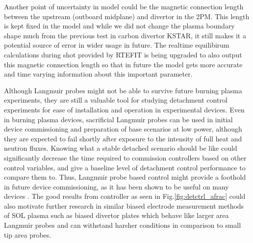 Another point of uncertainty in \Afrac model could be the magnetic connection length between the upstream (outboard midplane) and divertor in the 2PM\cite{Leonard_2018_PPCF}. This length is kept fixed in the model and while we did not change the plasma boundary shape much from the previous test\cite{Eldon_2022_PPCF} in carbon divertor KSTAR, it still makes it a potential source of error in wider usage in future. The realtime equilibirum calculations during shot provided by RTEFIT is being upgraded to also output this magnetic connection length so that in future the model gets more accurate and time varying information about this important parameter.

Although Langmuir probes might not be able to survive future burning plasma experiments, they are still a valuable tool for studying detachment control experiments for ease of installation and operation in experimental devices.
Even in burning plasma devices, sacrificial Langmuir probes can be used in initial device commissioning and preparation of base scenarios at low power, although they are expected to fail shortly after exposure to the intensity of full heat and neutron fluxes.
Knowing what a stable detached scenario should be like could significantly decrease the time required to commission controllers based on other control variables, and give a baseline level of detachment control performance to compare them to.
Thus, Langmuir probe based control might provide a foothold in future device commissioning, as it has been shown to be useful on many devices \cite{Eldon_2021_NME, Guillemaut_2017_PPCF, Yuan_2020_FED, Khodunov_2021_PPCF}.
The good results from \Afrac controller as seen in Fig.\ref{fig:detctrl_afrac} could also motivate further research in similar biased electrode measurement methods of SOL plasma such as biased divertor plates \cite{Toi_2023_NF, Cui_2024_NF} which behave like larger area Langmuir probes and can withstand harsher conditions in comparison to small tip area probes.

